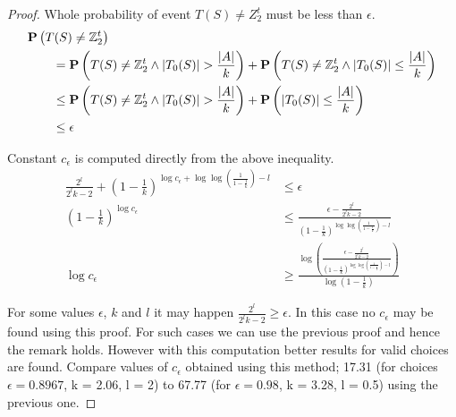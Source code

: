 \begin{proof}
Whole probability of event $T(S) \neq Z_2^t$ must be less than $\epsilon$.
\[
\begin{split}
& \mathbf{P}\left(T(S) \neq \mathbb{Z}_{2}^{t}\right) \\
	& \qquad = \mathbf{P}\left(T(S) \neq \mathbb{Z}_{2}^{t} \wedge |T_0(S)| > \frac {|A|}{k}\right) + \mathbf{P}\left(T(S) \neq \mathbb{Z}_{2}^{t} \wedge |T_0(S)| \leq \frac {|A|}{k}\right) \\
	& \qquad \leq \mathbf{P}\left(T(S) \neq \mathbb{Z}_{2}^{t} \wedge |T_0(S)| > \frac {|A|}{k}\right) + \mathbf{P}\left(|T_0(S)| \leq \frac {|A|}{k}\right) \\
	& \qquad \leq \epsilon
\end{split}
\]

Constant $c_\epsilon$ is computed directly from the above inequality.
\[
\begin{split}
\frac{2^l}{2^l k - 2} + \left(1 - \frac{1}{k}\right)^{\log c_\epsilon + \log \log \left( \frac{1}{1 - \frac{1}{k}} \right) - l} & \leq \epsilon \\
\left(1 - \frac{1}{k}\right)^{\log c_\epsilon} & \leq \frac{\epsilon - \frac{2^l}{2^l k - 2}}{\left(1 - \frac{1}{k}\right) ^ {\log \log \left(\frac{1}{1 - \frac{1}{k}}\right) - l}} \\
\log c_\epsilon & \geq \frac{\log \left(\frac{\epsilon - \frac{2^l}{2^l k - 2}}{\left(1 - \frac{1}{k}\right) ^ {\log \log \left( \frac{1}{1 - \frac{1}{k}} \right) - l}}\right)}{\log \left(1 - \frac{1}{k}\right)}
\end{split}
\]

For some values $\epsilon$, $k$ and $l$ it may happen $\frac{2^l}{2^l k - 2} \geq \epsilon$. In this case no $c_\epsilon$ may be found using this proof. For such cases we can use the previous proof and hence the remark holds. However with this computation better results for valid choices are found. Compare values of $c_\epsilon$ obtained using this method; 17.31 (for choices $\epsilon = 0.8967$, k = 2.06, l = 2) to 67.77 (for $\epsilon = 0.98$, k = 3.28, l = 0.5) using the previous one.
\end{proof}

